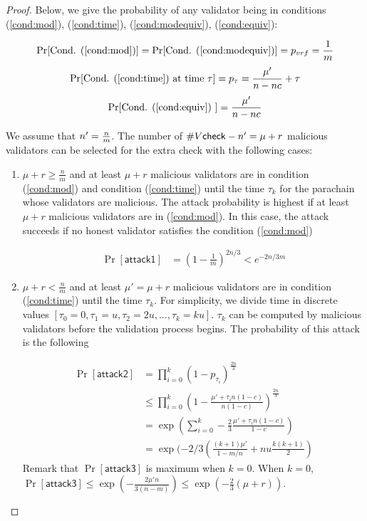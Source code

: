 \begin{proof}

Below, we give the probability of any validator being in conditions (\ref{cond:mod}), (\ref{cond:time}), (\ref{cond:modequiv}), (\ref{cond:equiv}):

$$\Pr[\text{Cond. (\ref{cond:mod})}] = \Pr[\text{Cond. (\ref{cond:modequiv})}] = p_{vrf} = \frac{1}{m}$$
$$\Pr[\text{Cond. (\ref{cond:time}) at time } \tau] = p_\tau =  \frac{\mu'}{n - nc} + \tau $$
$$\Pr[\text{Cond. (\ref{cond:equiv}) }] = \frac{\mu'}{n - nc} $$


We assume that $n' = \frac{n}{m}$.  The number of $\#V\mathsf{check}-n' = \mu + r$ malicious validators can be selected for the extra check with the following cases:

\begin{enumerate}
    
    \item $\mu + r \geq \frac{n}{m}$ and at least $\mu + r$ malicious validators are in condition (\ref{cond:mod}) and condition (\ref{cond:time}) until the time $\tau_k$ for the parachain whose validators are malicious. The attack probability is highest if at least $\mu + r$
    malicious validators are in (\ref{cond:mod}). In this case, the attack succeeds if no honest validator satisfies the condition (\ref{cond:mod}) 
    
    
    \begin{align}\label{eq:attack2}
        \Pr[\mathsf{attack1}] &= (1-\frac{1}{m})^{2n/3} <  e^{-2n/3m} \nonumber
    \end{align}
    
    
    \item $\mu+r < \frac{n}{m}$ and at least $\mu' = \mu+r$ malicious validators are in condition (\ref{cond:time}) until the time $\tau_k$. For simplicity, we divide time in discrete values $[\tau_0 = 0, \tau_1 =u, \tau_2 = 2u, ..., \tau_k = ku]$. $\tau_k$ can be computed by malicious validators before the validation process begins. The probability of this attack is the following
    
    \begin{align}
        \Pr[\mathsf{attack2}] &= \prod_{i = 0}^k(1-p_{\tau_i})^{\frac{2n}{3}} \nonumber\\
        &\leq  \prod_{i = 0}^k (1 - \frac{\mu'+\tau_in(1-c)}{n(1-c)})^{\frac{2n}{3}} \nonumber\\
        &=  \exp(\sum_{i = 0}^k -\frac{2}{3}\frac{\mu' + \tau_in(1-c)}{1-c}) \nonumber\\
        & = \exp(-2/3(\frac{(k+1)\mu'}{1-m/n}+ nu\frac{k(k+1)}{2})\nonumber
    \end{align}
    Remark that $\Pr[\mathsf{attack3}]$ is maximum when $k = 0$. When $k = 0$, $\Pr[\mathsf{attack3}] \leq \exp(-\frac{2\mu' n}{3(n-m)}) \leq \exp(-\frac{2}{3}(\mu + r))$.
    

\end{enumerate}
\end{proof}
